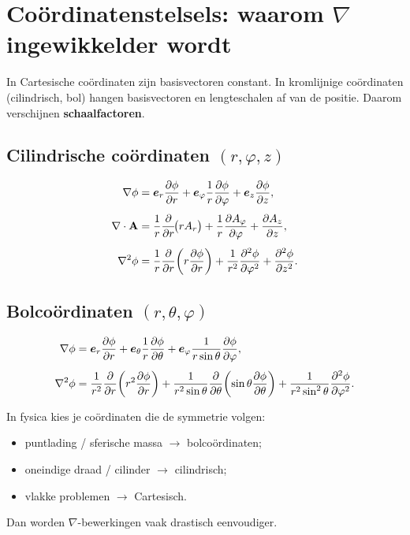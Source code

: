 \documentclass[11pt,a4paper]{article}
\begin{document}


    \section{Co\"ordinatenstelsels: waarom \texorpdfstring{$\nabla$}{∇} ingewikkelder wordt}
    In Cartesische co\"ordinaten zijn basisvectoren constant.
    In kromlijnige co\"ordinaten (cilindrisch, bol) hangen basisvectoren en lengteschalen af van de positie.
    Daarom verschijnen \textbf{schaalfactoren}.

    \subsection{Cilindrische co\"ordinaten \((r,\varphi,z)\)}
    \begin{align}
        \nabla \phi &=
        \vb*{e}_r \pdv{\phi}{r} +
        \vb*{e}_\varphi \frac{1}{r}\pdv{\phi}{\varphi} +
        \vb*{e}_z \pdv{\phi}{z},\\[4pt]
        \nabla\cdot\vb{A} &=
        \frac{1}{r}\pdv{}{r}\!\big(rA_r\big) + \frac{1}{r}\pdv{A_\varphi}{\varphi} + \pdv{A_z}{z},\\[4pt]
        \nabla^2\phi &=
        \frac{1}{r}\pdv{}{r}\!\left(r\pdv{\phi}{r}\right)
        + \frac{1}{r^2}\pdv[2]{\phi}{\varphi}
        + \pdv[2]{\phi}{z}.
    \end{align}

    \subsection{Bolco\"ordinaten \((r,\theta,\varphi)\)}
    \begin{align}
        \nabla \phi &=
        \vb*{e}_r \pdv{\phi}{r} +
        \vb*{e}_\theta \frac{1}{r}\pdv{\phi}{\theta} +
        \vb*{e}_\varphi \frac{1}{r\sin\theta}\pdv{\phi}{\varphi},\\[4pt]
        \nabla^2\phi &=
        \frac{1}{r^2}\pdv{}{r}\!\left(r^2\pdv{\phi}{r}\right)
        +\frac{1}{r^2\sin\theta}\pdv{}{\theta}\!\left(\sin\theta\pdv{\phi}{\theta}\right)
        +\frac{1}{r^2\sin^2\theta}\pdv[2]{\phi}{\varphi}.
    \end{align}

    \begin{tcolorbox}[colback=yellow!7,colframe=yellow!40,title=Praktische tip]
        In fysica kies je co\"ordinaten die de symmetrie volgen:
        \begin{itemize}
            \item puntlading / sferische massa \(\rightarrow\) bolco\"ordinaten;
            \item oneindige draad / cilinder \(\rightarrow\) cilindrisch;
            \item vlakke problemen \(\rightarrow\) Cartesisch.
        \end{itemize}
        Dan worden \(\nabla\)-bewerkingen vaak drastisch eenvoudiger.
    \end{tcolorbox}
\end{document}
